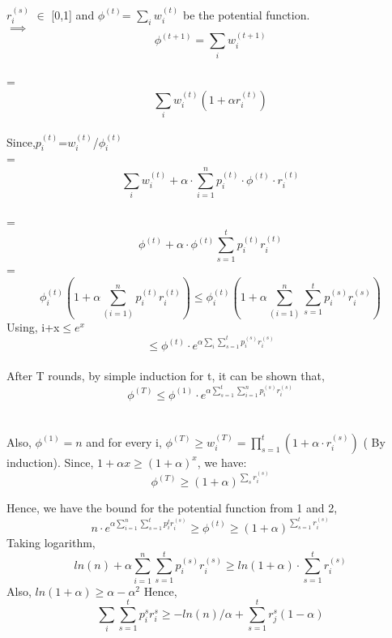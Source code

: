 $r_i^{(s)}$ $\in$ [0,1] and $\phi^{(t)}$= $\sum_{i}w_i^{(t)}$ be the potential function. \\
$\implies$ \\
$$\phi^{(t+1)}= \sum_{i}w_i^{(t+1)} $$\\
=$$\sum_{i} w_i^{(t)}(1+\alpha r_i^{(t)})$$ \\
Since,$ p_i^{(t)}$=$w_i^{(t)}$/$\phi_i^{(t)}$ \\
=$$\sum_{i}w_i^{(t)} + \alpha\cdot \sum_{i=1}^{n} p_i^{(t)}\cdot\phi^{(t)}\cdot r_i^{(t)} $$\\
=$$\phi^{(t)}+ \alpha\cdot\phi^{(t)}\sum_{s=1}^{t}p_i^{(t)}r_i^{(t)}$$
 =$$\phi_i^{(t)} (1 +\alpha\sum_{(i=1)}^{n}p_i^{(t)}r_i^{(t)}) \leq  \phi_i^{(t)} (1 +\alpha\sum_{(i=1)}^{n}\sum_{s=1}^{t}p_i^{(s)}r_i^{(s)})$$
Using, i+x$\leq e^x $
$$\leq \phi^{(t)}\cdot e^{\alpha\sum_{i}\sum_{s=1}^{t}p_i^{(s)}r_i^{(s)}}$$ \\

After T rounds, by simple induction for t, it can be shown that,
\begin{equation}
	\phi^{(T)}\leq \phi^{(1)}\cdot e^{\alpha\sum_{s=1}^{t}\sum_{i=1}^{n}p_i^{(s)}r_i^{(s)}}
\end{equation}
\\\\
Also, $\phi^{(1)}=n $ and for every i, 
$\phi^{(T)}\geq w_i^{(T)} = \prod_{s=1}^t(1+\alpha\cdot r_i^{(s)})$ ( By induction).
Since, $ 1+\alpha x \geq (1 +\alpha)^{x} $, we have:
\begin{equation}
	\phi^{(T)} \geq (1+\alpha)^{\sum_s{r_i^{(s)}}}
\end{equation}

Hence, we have the bound for the potential function from 1 and 2, \\
$$n\cdot e^{\alpha\sum_{i=1}^{n}\sum_{s=1}^{t}p_i^{t}r_i^{(s)}} \geq \phi^{(t)} \geq (1+\alpha)^{\sum_{s=1}^{t}r_i^{(s)}}$$
Taking logarithm, \\
$$ln(n) + \alpha\sum_{i=1}^{n}\sum_{s=1}^{t}p_i^{(s)}r_i^{(s)} \geq ln(1+\alpha)\cdot \sum_{s=1}^{t} r_i^{(s)}  $$
Also, $ ln(1+\alpha) \geq \alpha- \alpha^{2} $
Hence, \\

$$\sum_{i}\sum_{s=1}^{t}p_i^{s}r_i^{s} \geq -ln(n)/\alpha + \sum_{s=1}^{t}r_j^{s} (1-\alpha) $$